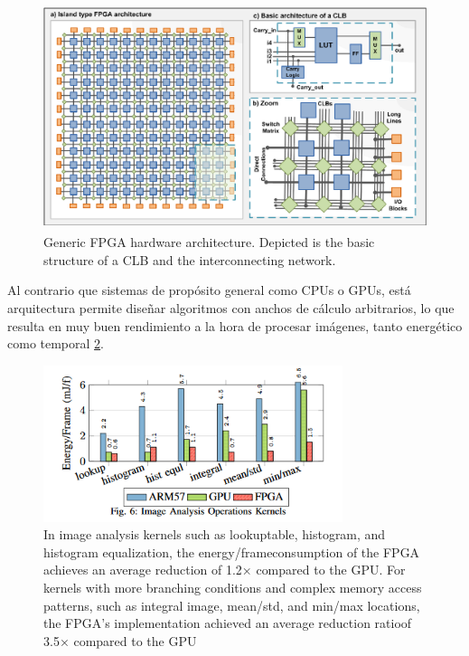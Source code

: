 \begin{figure}[h!]
\centering
\includegraphics[height=2.6in]{figures/clb.png}
\caption{Generic FPGA hardware architecture. Depicted is the basic structure of a CLB and the interconnecting network.}
  \label{fig:clb}
\end{figure}

\pagebreak

Al contrario que sistemas de propósito general como CPUs o GPUs, está arquitectura permite diseñar algoritmos con anchos de cálculo arbitrarios, lo que resulta en muy buen rendimiento a la hora de procesar imágenes, tanto energético como temporal \ref{fig:op_watt}.

\begin{figure}[h!]
\centering
\includegraphics[height=1.8in]{figures/op_watt.png}
\caption{In image analysis kernels  such  as  lookuptable, histogram, and histogram equalization, the energy/frameconsumption  of  the  FPGA  achieves  an  average  reduction  of 1.2× compared  to  the  GPU.  For  kernels  with  more branching  conditions  and  complex  memory  access  patterns, such as integral image, mean/std, and min/max locations, the FPGA’s  implementation  achieved  an  average  reduction  ratioof 3.5× compared to the GPU\cite{ochoa-ruiz_high-level_2012}}
  \label{fig:op_watt}
\end{figure}

\pagebreak

